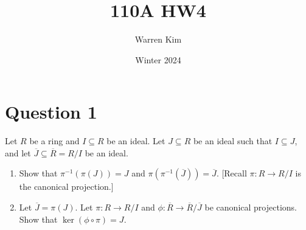 \documentclass [12pt] {article}
\title{110A HW4}
\author{Warren Kim}
\date{Winter 2024}
\begin{document}
\maketitle

\section*{Question 1}
Let $R$ be a ring and $I\subseteq R$ be an ideal. Let $J\subseteq R$ be an ideal such that
    $I\subseteq J$, and let $\overline{J}\subseteq \overline{R}=R/I$ be an ideal. 

\begin{enumerate}
    \item Show that $\pi^{-1}(\pi(J))=J$ and $\pi(\pi^{-1}(\overline{J}))=\overline{J}$. [Recall $\pi:R\to R/I$ is the canonical projection.]

    \item Let $\overline{J}=\pi(J)$. Let $\pi:R\to R/I$ and $\phi:\overline{R}\to \overline{R}/\overline{J}$ be canonical projections. 
    Show that $\ker(\phi\circ\pi)=J$. 
\end{enumerate}
\end{document}

